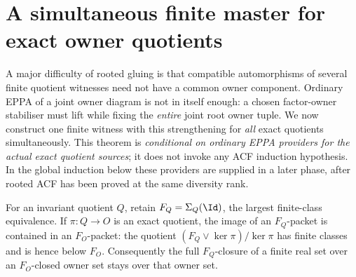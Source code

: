 \section{A simultaneous finite master for exact owner quotients}
\label{sec:acf-master}

A major difficulty of rooted gluing is that compatible
automorphisms of several finite quotient witnesses need
not have a common owner component.  Ordinary EPPA of a
joint owner diagram is not in itself enough: a chosen
factor-owner stabiliser must lift while fixing the
\emph{entire} joint root owner tuple.  We now construct
one finite witness with this strengthening for \emph{all}
exact quotients simultaneously.  This theorem is \emph{conditional on ordinary EPPA providers
for the actual exact quotient sources}; it does not invoke any ACF
induction hypothesis.  In the global induction below these providers
are supplied in a later phase, after rooted ACF has been proved at
the same diversity rank.

For an invariant quotient \(Q\), retain
\(F_Q=\Sigma_Q(\Id)\), the largest finite-class
equivalence.  If \(\pi:Q\to O\) is an exact
quotient, the image of an \(F_Q\)-packet is
contained in an \(F_O\)-packet: the quotient
\((F_Q\vee\ker\pi)/\ker\pi\) has finite
classes and is hence below \(F_O\).
Consequently the full \(F_Q\)-closure of
a finite real set over an \(F_O\)-closed
owner set stays over that owner set.

